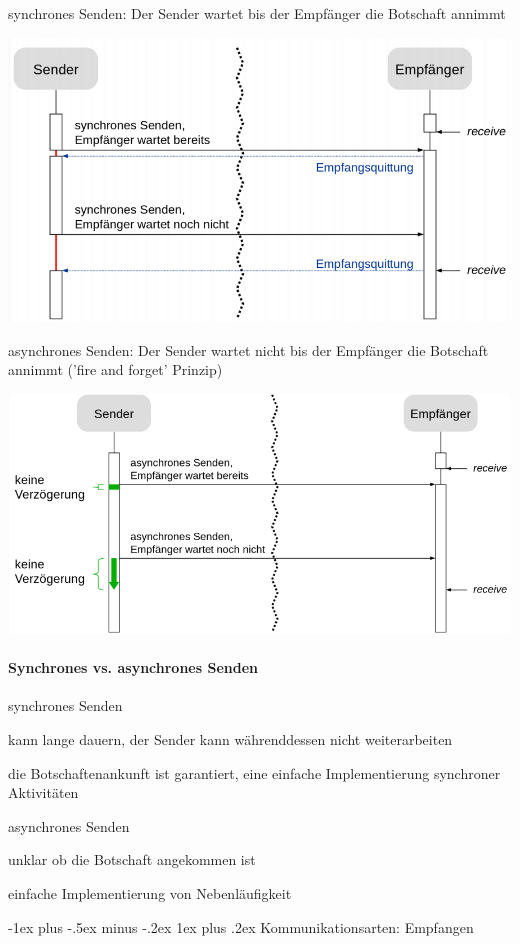 \documentclass[10pt]{article}
\makeatletter
\renewcommand{\subsubsection}{\@startsection{subsubsection}{3}{0mm}%
                                {-1ex plus -.5ex minus -.2ex}%
                                {1ex plus .2ex}%
                                {\normalfont\small\bfseries}}
\makeatother
\begin{document}
\color{orange} synchrones Senden: \color{black} Der Sender wartet bis der Empfänger die Botschaft annimmt
\begin{center}
  \includegraphics[width=0.4\linewidth]{Assets/Programmierparadigmen-synchrones-senden}
\end{center}
\noindent \color{orange} asynchrones Senden: \color{black} Der Sender wartet nicht bis der Empfänger die Botschaft annimmt ('fire and forget' Prinzip)
\begin{center}
  \includegraphics[width=0.4\linewidth]{Assets/Programmierparadigmen-asynchrones-senden}
\end{center}

\paragraph{Synchrones vs. asynchrones Senden}

\begin{itemize*}
  \item synchrones Senden
  \begin{itemize*}
    \item kann lange dauern, der Sender kann währenddessen nicht weiterarbeiten
    \item die Botschaftenankunft ist garantiert, eine einfache Implementierung synchroner Aktivitäten
  \end{itemize*}
  \item asynchrones Senden
  \begin{itemize*}
    \item unklar ob die Botschaft angekommen ist
    \item einfache Implementierung von Nebenläufigkeit
  \end{itemize*}
\end{itemize*}

\subsubsection{Kommunikationsarten: Empfangen}
\end{document}
